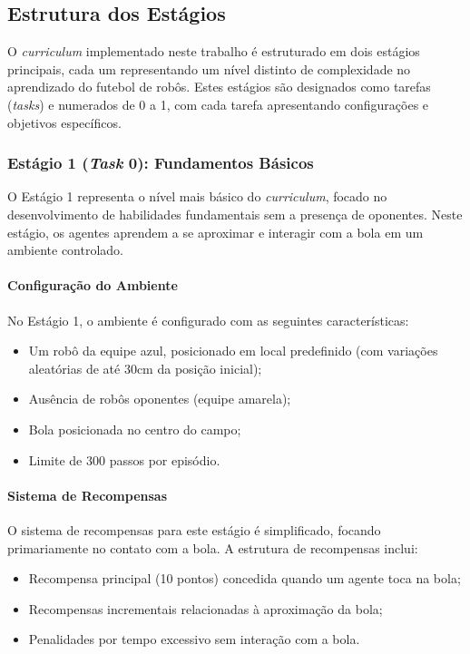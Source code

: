 \subsection{Estrutura dos Estágios}

O \textit{curriculum} implementado neste trabalho é estruturado em dois estágios principais, cada um representando um nível distinto de complexidade no aprendizado do futebol de robôs. Estes estágios são designados como tarefas (\textit{tasks}) e numerados de 0 a 1, com cada tarefa apresentando configurações e objetivos específicos.

\subsubsection{Estágio 1 (\textit{Task} 0): Fundamentos Básicos}
\label{subsubsec:estagio1}

O Estágio 1 representa o nível mais básico do \textit{curriculum}, focado no desenvolvimento de habilidades fundamentais sem a presença de oponentes. Neste estágio, os agentes aprendem a se aproximar e interagir com a bola em um ambiente controlado.

\paragraph{Configuração do Ambiente}

No Estágio 1, o ambiente é configurado com as seguintes características:
\begin{itemize}
    \item Um robô da equipe azul, posicionado em local predefinido (com variações aleatórias de até 30cm da posição inicial);
    \item Ausência de robôs oponentes (equipe amarela);
    \item Bola posicionada no centro do campo;
    \item Limite de 300 passos por episódio.
\end{itemize}

\paragraph{Sistema de Recompensas}

O sistema de recompensas para este estágio é simplificado, focando primariamente no contato com a bola. A estrutura de recompensas inclui:
\begin{itemize}
    \item Recompensa principal (10 pontos) concedida quando um agente toca na bola;
    \item Recompensas incrementais relacionadas à aproximação da bola;
    \item Penalidades por tempo excessivo sem interação com a bola.
\end{itemize}

